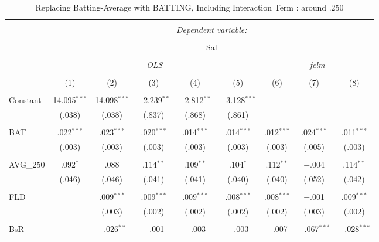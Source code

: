 
\begin{table}[H] \centering 
  \caption{Replacing Batting-Average with BATTING, Including Interaction Term
          : around .250} 
  \label{AVG250_C} 
\tiny 
\begin{tabular}{@{\extracolsep{5pt}}lcccccccc} 
\\[-1.8ex]\hline 
\hline \\[-1.8ex] 
 & \multicolumn{8}{c}{\textit{Dependent variable:}} \\ 
\cline{2-9} 
\\[-1.8ex] & \multicolumn{8}{c}{Sal} \\ 
\\[-1.8ex] & \multicolumn{5}{c}{\textit{OLS}} & \multicolumn{3}{c}{\textit{felm}} \\ 
\\[-1.8ex] & (1) & (2) & (3) & (4) & (5) & (6) & (7) & (8)\\ 
\hline \\[-1.8ex] 
 Constant & 14.095$^{***}$ & 14.098$^{***}$ & $-$2.239$^{**}$ & $-$2.812$^{**}$ & $-$3.128$^{***}$ &  &  &  \\ 
  & (.038) & (.038) & (.837) & (.868) & (.861) &  &  &  \\ 
  & & & & & & & & \\ 
 BAT & .022$^{***}$ & .023$^{***}$ & .020$^{***}$ & .014$^{***}$ & .014$^{***}$ & .012$^{***}$ & .024$^{***}$ & .011$^{***}$ \\ 
  & (.003) & (.003) & (.003) & (.003) & (.003) & (.003) & (.005) & (.003) \\ 
  & & & & & & & & \\ 
 AVG\_250 & .092$^{*}$ & .088 & .114$^{**}$ & .109$^{**}$ & .104$^{*}$ & .112$^{**}$ & $-$.004 & .114$^{**}$ \\ 
  & (.046) & (.046) & (.041) & (.041) & (.040) & (.040) & (.052) & (.042) \\ 
  & & & & & & & & \\ 
 FLD &  & .009$^{***}$ & .009$^{***}$ & .009$^{***}$ & .008$^{***}$ & .008$^{***}$ & $-$.001 & .009$^{***}$ \\ 
  &  & (.003) & (.002) & (.002) & (.002) & (.002) & (.003) & (.002) \\ 
  & & & & & & & & \\ 
 BsR &  & $-$.026$^{**}$ & $-$.001 & $-$.003 & $-$.003 & $-$.007 & $-$.067$^{***}$ & $-$.028$^{***}$ \\ 

\end{tabular}
\end{table}
